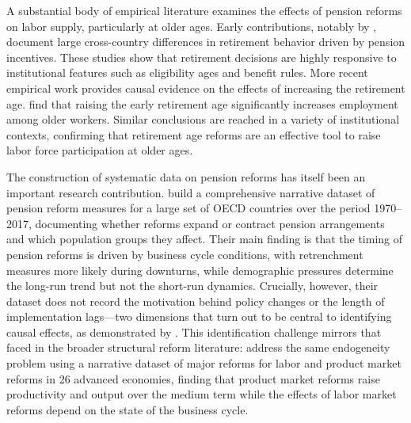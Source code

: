 \documentclass[11pt,english,a4paper, twoside, authoryear]{article}
\begin{document}
A substantial body of empirical literature examines the effects of pension reforms on labor supply, particularly at older ages. Early contributions, notably by \citet{GruberWise1999}, document large cross-country differences in retirement behavior driven by pension incentives. These studies show that retirement decisions are highly responsive to institutional features such as eligibility ages and benefit rules. More recent empirical work provides causal evidence on the effects of increasing the retirement age. \citet{StaubliZweimuller2013} find that raising the early retirement age significantly increases employment among older workers. Similar conclusions are reached in a variety of institutional contexts, confirming that retirement age reforms are an effective tool to raise labor force participation at older ages.

The construction of systematic data on pension reforms has itself been an important research contribution. \citet{Beetsma2020} build a comprehensive narrative dataset of pension reform measures for a large set of OECD countries over the period 1970--2017, documenting whether reforms expand or contract pension arrangements and which population groups they affect. Their main finding is that the timing of pension reforms is driven by business cycle conditions, with retrenchment measures more likely during downturns, while demographic pressures determine the long-run trend but not the short-run dynamics. Crucially, however, their dataset does not record the motivation behind policy changes or the length of implementation lags---two dimensions that turn out to be central to identifying causal effects, as demonstrated by \citet{BiZubairy2023}. This identification challenge mirrors that faced in the broader structural reform literature: \citet{DuvalFurceri2018} address the same endogeneity problem using a narrative dataset of major reforms for labor and product market reforms in 26 advanced economies, finding that product market reforms raise productivity and output over the medium term while the effects of labor market reforms depend on the state of the business cycle. %
\end{document}
